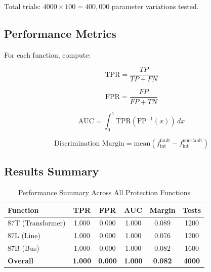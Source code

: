\documentclass[12pt,a4paper]{article}
\begin{document}
Total trials: $4000 \times 100 = 400,000$ parameter variations tested.

\subsection{Performance Metrics}
\label{subsec:metrics}

For each function, compute:

\begin{equation}
\text{TPR} = \frac{TP}{TP + FN}
\end{equation}

\begin{equation}
\text{FPR} = \frac{FP}{FP + TN}
\end{equation}

\begin{equation}
\text{AUC} = \int_0^1 \text{TPR}(\text{FP}^{-1}(x)) \, dx
\end{equation}

\begin{equation}
\text{Discrimination Margin} = \text{mean}(f_{\text{int}}^{\text{fault}} - f_{\text{int}}^{\text{non-fault}})
\end{equation}

\subsection{Results Summary}
\label{subsec:results_summary}

\begin{table}[H]
\centering
\caption{Performance Summary Across All Protection Functions}
\label{tab:perf_summary}
\begin{tabular}{lccccc}
\toprule
\textbf{Function} & \textbf{TPR} & \textbf{FPR} & \textbf{AUC} & \textbf{Margin} & \textbf{Tests} \\
\midrule
87T (Transformer) & 1.000 & 0.000 & 1.000 & 0.089 & 1200 \\
87L (Line) & 1.000 & 0.000 & 1.000 & 0.076 & 1200 \\
87B (Bus) & 1.000 & 0.000 & 1.000 & 0.082 & 1600 \\
\midrule
\textbf{Overall} & \textbf{1.000} & \textbf{0.000} & \textbf{1.000} & \textbf{0.082} & \textbf{4000} \\
\bottomrule
\end{tabular}
\end{table}
\end{document}
